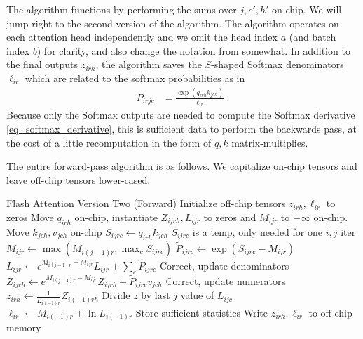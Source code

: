 \documentclass[11pt]{article}
\begin{document}
The algorithm functions by performing the sums over $ j, c', h' $  on-chip. We will jump
right to the second version of the algorithm.  The algorithm operates on each attention head
independently and we omit the head index $ a $ (and batch index $ b $) for clarity, and also change
the notation from \cite{dao2023flashattention2} somewhat. In addition to the final outputs $ z _{ irh } $,
the algorithm saves the $ S $-shaped Softmax denominators $ \ell _{ ir } $  which are related to the
softmax probabilities as in
\begin{align}
    P _{ irjc } &= \frac{  \exp \left (   q _{ irh } k _{ jch }\right)}{ \ell _{ ir } } \ .
\end{align}
Because only the Softmax outputs are needed to compute the Softmax derivative \eqref{eq_softmax_derivative},
this is sufficient data to perform the backwards pass, at the cost of a little recomputation in the form
of $ q, k $ matrix-multiplies.



The entire forward-pass algorithm is as follows. We capitalize on-chip tensors and leave off-chip
tensors lower-cased.

\begin{algo}{Flash Attention Version Two (Forward)}
\State Initialize off-chip tensors $ z _{ irh },  \ell _{ ir }$ to zeros
    \State Move  $ q _{ irh }$ on-chip, instantiate $Z _{ ijrh }, L _{ ijr }$ to zeros and $M _{ ijr }$ to $ -\infty $ on-chip.
    \State Move  $ k_{ jch },v _{ jch }$ on-chip
    \State $ S _{ ijrc } \gets q _{ irh } k _{ jch } $  \Comment $ S _{ ijrc } $ is a temp, only needed for one $ i,j $ iter
    \State $ M _{ ijr }  \gets \max(M _{ i(j-1)r },  \max _{ c } S _{ ijrc } ) $
    \State $ \tilde{P} _{ ijrc} \gets \exp \left ( S _{ ijrc } - M _{ ijr } \right ) $
    \State $ L _{ ijr }  \gets e^{ M _{ i(j-1)r } - M _{ ijr }}L _{ ijr } + \sum _{ c }\tilde{P} _{ ijrc }$ \Comment Correct, update denominators
    \State $ Z _{ ijrh } \gets   e^{ M _{ i(j-1)r } - M _{ ijr } }Z _{ ijrh } +\tilde{P} _{ ijrc}v _{ jch }$ \Comment Correct, update numerators
\EndFor
\State $ z _{ irh } \gets \frac{1}{L _{ i(-1)r }} Z _{ i(-1)rh }$ \Comment Divide $ z $ by last $ j  $ value of $ L _{ ijc } $
    \State $ \ell _{ ir } \gets M _{ i(-1)r }+\ln L _{ i(-1)r }$ \Comment Store sufficient statistics
    \State Write  $z _{ irh } ,  \ell _{ ir }$ to off-chip memory
\EndFor

\label{algo_fa_v2}
\end{algo}
\end{document}
